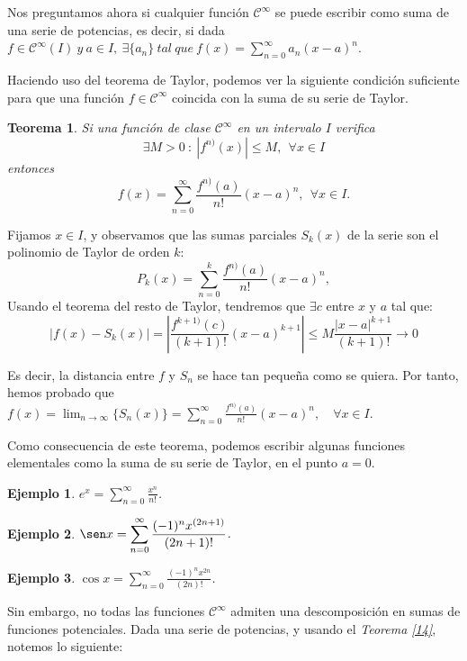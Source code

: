 \documentclass[11pt, a4paper]{article}
\makeatletter
\newif\IfInSansMode
\let\oldsf\sffamily
\renewcommand*{\sffamily}{\oldsf\mathversion{sans}\InSansModetrue}
\let\oldnorm\normalfont
\renewcommand*{\normalfont}{\oldnorm\InSansModefalse\mathversion{normal}}
\renewenvironment{proof}[1][\proofname] {\par\pushQED{\qed}\normalfont\topsep6\p@\@plus6\p@\relax\trivlist\item[\hskip\labelsep\itshape\sffamily#1\@addpunct{.}]\ignorespaces}{\popQED\endtrivlist\@endpefalse}
\theoremstyle{theorem-style}
\newtheorem{nth}{Teorema}[section]
\theoremstyle{definition-style}
\theoremstyle{remark-style}
\theoremstyle{example-style}
\newtheorem{ejemplo}{Ejemplo}[section]
\makeatother
\begin{document}
Nos preguntamos ahora si cualquier función $\mathcal{C}^{\infty}$ se puede escribir como suma de una serie de potencias, es decir, si dada $f \in \mathcal{C}^{\infty}(I)\ y\ a \in I, \ \exists \{a_n\}\ tal\ que\ f(x) = \sum_{n=0}^{\infty}a_n(x-a)^n$.


Haciendo uso del teorema de Taylor, podemos ver la siguiente condici\'on suficiente para que una funci\'on $f\in \mathcal{C}^\infty$ coincida con la suma de su serie de Taylor.

\begin{nth} \label{15}
  Si una funci\'on de clase $\mathcal{C}^\infty$ en un intervalo $I$ verifica 
  \[
    \exists M>0 \ : \  |f^{n)}(x)|\leq M, \ \ \forall x\in I
  \]
  entonces 
  \[
    f(x) = \sum_{n=0}^\infty \frac{f^{n)} (a)}{n!} (x-a)^n , \ \ \forall x\in I.
  \]
\end{nth}

  \begin{proof}
    Fijamos $x \in I$, y observamos que las sumas parciales $S_k(x)$ de la serie son el polinomio de Taylor de orden $k$: 
    \[
      P_k(x) =  \sum_{n=0}^k \frac{f^{n)} (a)}{n!} (x-a)^n,
    \]
    Usando el teorema del resto de Taylor, tendremos que $\exists c$ entre $x$ y $a$ tal que:
    \[
      |f(x)-S_k(x)| =\left| \frac{ f^{k+1)} (c)}{(k+1)!} (x-a)^{k+1}\right| \leq  M \frac{|x-a|^{k+1}}{(k+1)!} \to 0
    \]

    Es decir, la distancia entre $f$ y $S_n$ se hace tan pequeña como se quiera. Por tanto, hemos probado que $\displaystyle f(x) = \lim_{n \to \infty} \{S_n(x)\} = \sum_{n=0}^{\infty} \frac{f^{n)} (a)}{n!} (x-a)^n, \quad \forall x \in I$.
  \end{proof}

Como consecuencia de este teorema, podemos escribir algunas funciones elementales como la suma de su serie de Taylor, en el punto $a = 0$.

\begin{ejemplo}
  $e^x = \displaystyle \sum_{n=0}^\infty  \frac{x^n}{n!}$. 
\end{ejemplo}

\begin{ejemplo}
  $\sen x = \displaystyle \sum_{n=0}^\infty   \frac{(-1)^n x^{(2n+1)}}{(2n+1)!}$.
\end{ejemplo}
\begin{ejemplo}
  $\cos x = \displaystyle \sum_{n=0}^\infty   \frac{(-1)^n x^{2n}}{(2n)!}$.
\end{ejemplo}


Sin embargo, no todas las funciones $\mathcal{C}^{\infty}$ admiten una descomposición en sumas de funciones potenciales. Dada una serie de potencias, y usando el \textit{Teorema \ref{14}}, notemos lo siguiente:
\end{document}
